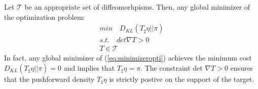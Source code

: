 \documentclass[table]{beamer}
\begin{document}
\begin{CJK}{UTF8}{gbsn}
\begin{frame}
Let $\mathcal{T}$ be an appropriate set of diffeomorhpisms. Then, any global minimizer of the optimization problem:
\begin{equation}\label{eq:minimizeropti}
\begin{aligned}
min \quad D_{KL}(T_{\sharp}\eta || \pi)\\
s.t. \quad det \nabla T > 0 \\
T \in \mathcal{T}
\end{aligned}
\end{equation}
In fact, any global minimizer of (\ref{eq:minimizeropti}) achieves the minimum cost $D_{KL}(T_{\sharp}\eta || \pi)=0$ and implies that $T_{\sharp}\eta = \pi$. The constraint det $\nabla T >0$ ensures that the pushforward density $T_{\sharp}\eta$ is strictly postive on the support of the target.
\end{frame}


\end{CJK}
\end{document}
